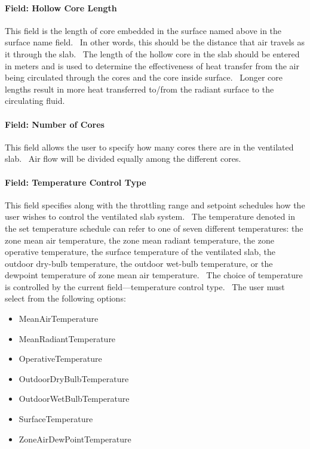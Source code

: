\paragraph{Field: Hollow Core Length}\label{field-hollow-core-length}

This field is the length of core embedded in the surface named above in the surface name field.~ In other words, this should be the distance that air travels as it through the slab.~ The length of the hollow core in the slab should be entered in meters and is used to determine the effectiveness of heat transfer from the air being circulated through the cores and the core inside surface.~ Longer core lengths result in more heat transferred to/from the radiant surface to the circulating fluid.

\paragraph{Field: Number of Cores}\label{field-number-of-cores}

This field allows the user to specify how many cores there are in the ventilated slab.~ Air flow will be divided equally among the different cores.

\paragraph{Field: Temperature Control Type}\label{field-temperature-control-type-4}

This field specifies along with the throttling range and setpoint schedules how the user wishes to control the ventilated slab system.~ The temperature denoted in the set temperature schedule can refer to one of seven different temperatures: the zone mean air temperature, the zone mean radiant temperature, the zone operative temperature, the surface temperature of the ventilated slab, the outdoor dry-bulb temperature, the outdoor wet-bulb temperature, or the dewpoint temperature of zone mean air temperature.~ The choice of temperature is controlled by the current field---temperature control type.~ The user must select from the following options:

\begin{itemize}
\item
  MeanAirTemperature
\item
  MeanRadiantTemperature
\item
  OperativeTemperature
\item
  OutdoorDryBulbTemperature
\item
  OutdoorWetBulbTemperature
\item
  SurfaceTemperature
\item
  ZoneAirDewPointTemperature
\end{itemize}

